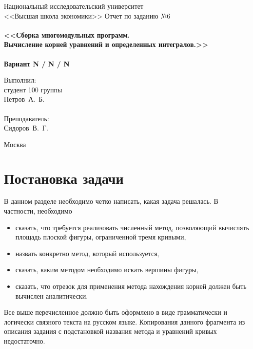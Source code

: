 \documentclass[a4paper,12pt,titlepage,final]{article}
\newcommand{\university}{Национальный исследовательский университет\\
<<Высшая школа экономики>>}
\begin{document}
\begin{titlepage}
    \begin{center}
	{\small \sc \university}
	\vfill
	{\Large \sc Отчет по заданию №6}\\
	~\\
	{\large \bf <<Сборка многомодульных программ. \\
	Вычисление корней уравнений и определенных интегралов.>>}\\ 
	~\\
	{\large \bf Вариант N / N / N}
    \end{center}
    \begin{flushright}
	\vfill {Выполнил:\\
	студент 100 группы\\
	Петров~А.~Б.\\
	~\\
	Преподаватель:\\
	Сидоров~В.~Г.}
    \end{flushright}
    \begin{center}
	\vfill
	{\small Москва\\ \the\year{}}
    \end{center}
\end{titlepage}

\tableofcontents
\newpage

\section{Постановка задачи}

В данном разделе необходимо четко написать, какая задача решалась. В частности, необходимо
\begin{itemize}
\item сказать, что требуется реализовать численный метод, позволяющий вычислять площадь плоской фигуры,
	ограниченной тремя кривыми,
\item назвать конкретно метод, который используется,
\item сказать, каким методом необходимо искать вершины фигуры,
\item сказать, что отрезок для применения метода нахождения корней должен быть вычислен аналитически.
\end{itemize}
Все выше перечисленное должно быть оформлено в виде грамматически и логически
связного текста на русском языке. Копирования данного фрагмента из описания задания 
с подстановкой названия метода и уравнений кривых недостаточно.
\end{document}
